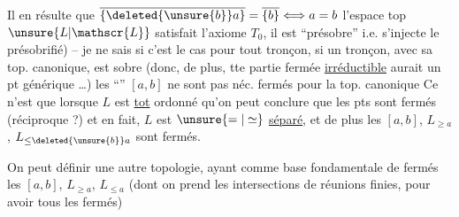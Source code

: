 Il en résulte que $\overline{\{\deleted{\unsure{b}}a\}}=\overline{\{b\}}\Longleftrightarrow a=b$  l'espace top $\unsure{L|\mathscr{L}}$ satisfait l'axiome $T_0$, il est ``présobre'' i.e. s'injecte  le présobrifié) -- je ne sais si c'est
le cas pour tout tronçon,  si un tronçon, avec sa top. canonique, est sobre (donc, de plus, tte partie fermée \uline{irréductible} aurait un pt générique \dots)
les ``'' $[a,b]$ ne sont pas néc. fermés pour la top. canonique\unsure{$^{\dagger}$|$^{+}$|!}
Ce n'est que lorsque $L$ est \uline{tot} ordonné qu'on peut conclure que les pts sont fermés (réciproque ?) et en fait, $L$ est $\unsure{=|\simeq}$ \uline{séparé}, et de plus les $[a,b]$, $L_{\geq a}$, $L_{\leq\deleted{\unsure{b}}a}$ sont fermés.

On peut définir une autre topologie, ayant comme base fondamentale de fermés les $[a,b]$, $L_{\geq a}$, $L_{\leq a}$ (dont on prend les intersections  de réunions finies, pour avoir tous les fermés)
